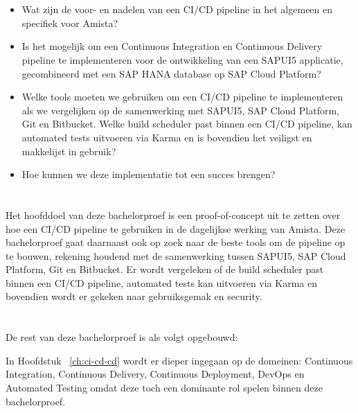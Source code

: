 \section{}
\label{sec:onderzoeksvraag}
\begin{itemize}
    \item Wat zijn de voor- en nadelen van een CI/CD pipeline in het algemeen en specifiek voor Amista?
    \item Is het mogelijk om een Continuous Integration en Continuous Delivery pipeline te implementeren voor de ontwikkeling van een SAPUI5 applicatie, gecombineerd met een SAP HANA database op SAP Cloud Platform?
    \item Welke tools moeten we gebruiken om een CI/CD pipeline te implementeren als we vergelijken op de samenwerking met SAPUI5, SAP Cloud Platform, Git en Bitbucket. Welke build scheduler past binnen een CI/CD pipeline, kan automated tests uitvoeren via Karma en is bovendien het veiligst en makkelijst in gebruik?
    \item Hoe kunnen we deze implementatie tot een succes brengen?
\end{itemize}

\section{}
\label{sec:onderzoeksdoelstelling}
Het hoofddoel van deze bachelorproef is een proof-of-concept uit te zetten over hoe een CI/CD pipeline te gebruiken in de dagelijkse werking van Amista.
Deze bachelorproef gaat daarnaast ook op zoek naar de beste tools om de pipeline op te bouwen, rekening houdend met de samenwerking tussen SAPUI5, SAP Cloud Platform, Git en Bitbucket. Er wordt vergeleken of de build scheduler past binnen een CI/CD pipeline, automated tests kan uitvoeren via Karma en bovendien wordt er gekeken naar gebruiksgemak en security.

\section{}
\label{sec:opzet-bachelorproef}
De rest van deze bachelorproef is als volgt opgebouwd:

In Hoofdstuk ~\ref{ch:ci-cd-cd} wordt er dieper ingegaan op de domeinen: Continuous Integration, Continuous Delivery, Continuous Deployment, DevOps en Automated Testing omdat deze toch een dominante rol spelen binnen deze bachelorproef.

